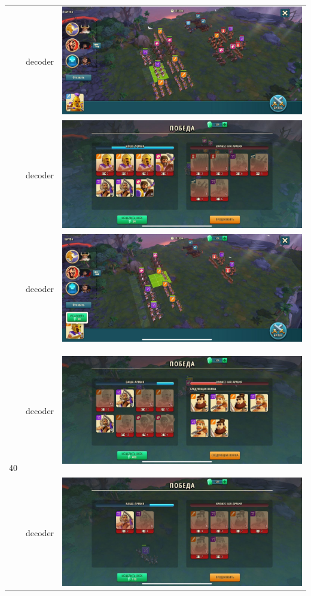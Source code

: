 \begin{longtable}{|c|c|c|}
	& decoder &
	\includegraphics[width=0.75\linewidth]{./parts/media/TreasureHunt/39/decoder/photo_2022-04-07_13-15-27.jpg} \\
	& decoder &
	\includegraphics[width=0.75\linewidth]{./parts/media/TreasureHunt/39/decoder/photo_2022-04-07_13-15-43.jpg} \\
	& decoder &
	\includegraphics[width=0.75\linewidth]{./parts/media/TreasureHunt/39/decoder/photo_2022-04-07_13-15-39.jpg} \\
	\hline
	\multirow{4}{*}{40} & decoder &
	\hypertarget{fight40}{\includegraphics[width=0.75\linewidth]{./parts/media/TreasureHunt/40/decoder/photo_2022-04-07_13-16-08.jpg}} \\
	& decoder &
	\includegraphics[width=0.75\linewidth]{./parts/media/TreasureHunt/40/decoder/photo_2022-04-07_13-16-15.jpg} \\

\end{longtable}
